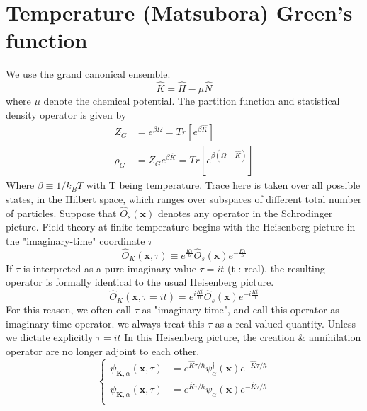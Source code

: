 \section{Temperature (Matsubora) Green's function}

We use the grand canonical ensemble.
$$\hat{K}=\hat{H}-\mu\hat{N}$$
where $\mu$ denote the chemical potential.
The partition function and statistical density operator is given by
\begin{align}
Z_{G} & =e^{\beta\Omega}=Tr[e^{\beta \hat{K}}] \\
\rho_{G} & =Z_{G}e^{\beta\hat{K}}=Tr[e^{\beta (\Omega-\hat{K})}]
\end{align}
Where $\beta \equiv 1/k_{B}T$ with T being temperature.
Trace here is taken over all possible states, in the Hilbert space, which ranges over subspaces of different total number of particles.
Suppose that $\hat{O}_{s}(\mathbf{x})$ denotes any operator in the Schrodinger picture.
Field theory at finite temperature begins with the Heisenberg picture in the "imaginary-time" coordinate $\tau$
\begin{equation}
\hat{O}_{K}(\mathbf{x},\tau)\equiv e^{\frac{K\tau}{\hbar}}\hat{O}_s(\mathbf{x})e^{-\frac{K\tau}{\hbar}}
\end{equation}
If $\tau$ is interpreted as a pure imaginary value $\tau=it$ (t : real), the resulting operator is formally identical to the usual Heisenberg picture.
$$\hat{O}_{K}(\mathbf{x},\tau=it)= e^{i\frac{Kt}{\hbar}}\hat{O}_s(\mathbf{x})e^{-i\frac{Kt}{\hbar}}$$
For this reason, we often call $\tau$ as "imaginary-time", and call this operator as imaginary time operator.
 we always treat this $\tau$ as a real-valued quantity. Unless we dictate explicitly $\tau=it$
In this Heisenberg picture, the creation \& annihilation operator are no longer adjoint to each other.
\begin{equation}
\left\{
\begin{aligned}
\psi^{\dagger}_{\mathbf{K},\alpha}(\mathbf{x},\tau) &=e^{\hat{K}\tau/\hbar}\psi^{\dagger}_{\alpha}(\mathbf{x})e^{-\hat{K}\tau/\hbar}\\
\psi_{\mathbf{K},\alpha}(\mathbf{x},\tau) &=e^{\hat{K}\tau/\hbar}\psi_{\alpha}(\mathbf{x})e^{-\hat{K}\tau/\hbar}\\
\end{aligned}
\right.
\end{equation}
